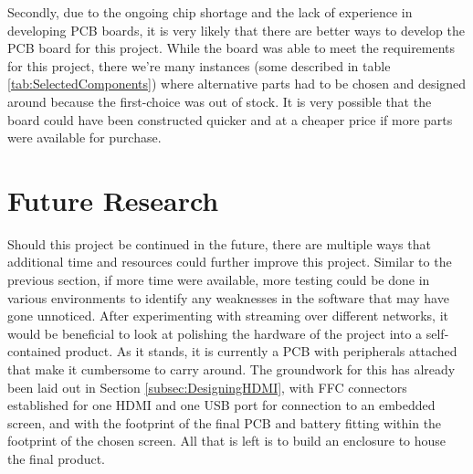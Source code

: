 Secondly, due to the ongoing chip shortage and the lack of experience in developing PCB boards, it is very likely that there are better ways to develop the PCB board for this project.
While the board was able to meet the requirements for this project, there we're many instances (some described in table \ref{tab:SelectedComponents}) where alternative parts had to be chosen and designed around because the first-choice was out of stock.
It is very possible that the board could have been constructed quicker and at a cheaper price if more parts were available for purchase.


\section{Future Research}\label{sec:ConclusionFutureResearch}

Should this project be continued in the future, there are multiple ways that additional time and resources could further improve this project.
Similar to the previous section, if more time were available, more testing could be done in various environments to identify any weaknesses in the software that may have gone unnoticed.
After experimenting with streaming over different networks, it would be beneficial to look at polishing the hardware of the project into a self-contained product.
As it stands, it is currently a PCB with peripherals attached that make it cumbersome to carry around.
The groundwork for this has already been laid out in Section \ref{subsec:DesigningHDMI}, with FFC connectors established for one HDMI and one USB port for connection to an embedded screen, and with the footprint of the final PCB and battery fitting within the footprint of the chosen screen.
All that is left is to build an enclosure to house the final product.